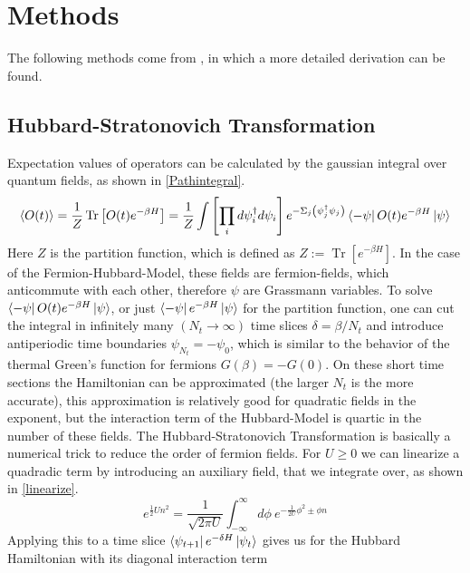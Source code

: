 \section{Methods}
The following methods come from \cite{luu}, in which a more detailed derivation can be found.
\subsection{Hubbard-Stratonovich Transformation}
Expectation values of operators can be calculated by the gaussian integral over quantum fields, as shown in \eqref{Pathintegral}. 
\begin{equation}\label{Pathintegral}
\langle O(t)\rangle = \frac{1}{Z} \operatorname{Tr}\left[O(t) e^{-\beta H}\right] =
\frac{1}{Z} \int\left[\prod_{i} d \psi_{i}^{\dagger} d \psi_{i}\right] e^{-\Sigma_{j}\left(\psi_{j}^{\dagger} \psi_{j}\right)}\bra{-\psi}O(t) e^{-\beta H}\ket{\psi}
\end{equation}
Here $Z $ is the partition function, which is defined as $Z:=\operatorname{Tr} \left[ e^{-\beta H}\right]$.
In the case of the Fermion-Hubbard-Model, these fields are fermion-fields, which anticommute with each other, therefore $\psi$ are Grassmann variables.
To solve $\bra{-\psi}O(t) e^{-\beta H}\ket{\psi}$, or just $\bra{-\psi}e^{-\beta H}\ket{\psi}$ for the partition function, one can cut the integral in infinitely many $(N_t\rightarrow\infty)$ time slices $\delta=\beta/N_t$ and introduce antiperiodic time boundaries $\psi_{N_t}=-\psi_{0}$, which is similar to the behavior of the thermal Green's function for fermions $G(\beta)=-G(0)$.
On these short time sections the Hamiltonian can be approximated (the larger $N_t$ is the more accurate), this approximation is relatively good for quadratic fields in the exponent, but the interaction term of the Hubbard-Model is quartic in the number of these fields.
The Hubbard-Stratonovich Transformation is basically a numerical trick to reduce the order of fermion fields. For $U\geq0$ we can linearize a quadradic term by introducing an auxiliary field, that we integrate over, as shown in \eqref{linearize}.
\begin{equation}\label{linearize}
e^{\frac{1}{2} U n^{2}}=\frac{1}{\sqrt{2 \pi U}} \int_{-\infty}^{\infty} d \phi\: e^{-\frac{1}{2 U} \phi^{2} \pm \phi n}
\end{equation}
Applying this to a time slice $\bra{\psi_{t+1}}e^{-\delta H} \ket{\psi_{t}}$ gives us for the Hubbard Hamiltonian with its diagonal interaction term
